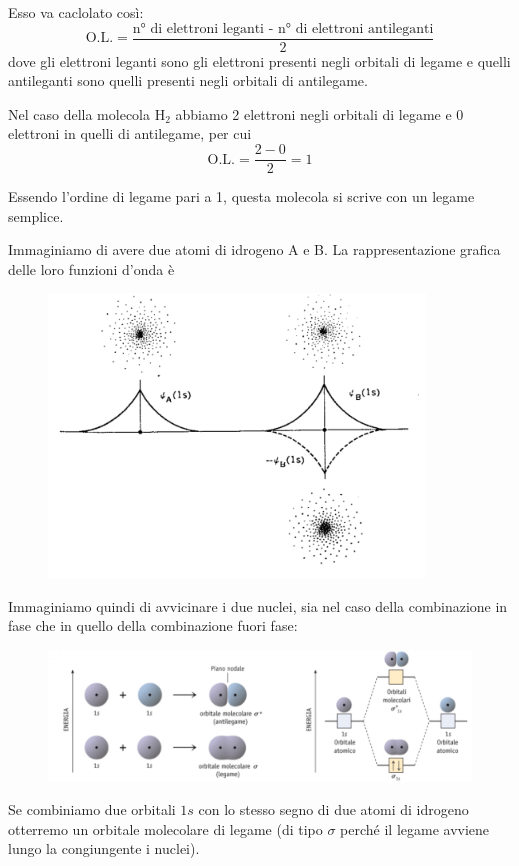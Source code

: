 Esso va caclolato così:
$$\text{O.L.}=\frac{\text{n° di elettroni leganti - n° di elettroni antileganti}}{2}$$
dove gli elettroni leganti sono gli elettroni presenti negli orbitali di legame e quelli antileganti sono quelli presenti negli orbitali di antilegame.

Nel caso della molecola H$_2$ abbiamo 2 elettroni negli orbitali di legame e 0 elettroni in quelli di antilegame, per cui
$$\text{O.L.}=\frac{2-0}{2}=1$$

Essendo l'ordine di legame pari a 1, questa molecola si scrive con un legame semplice.

\vspace{0.2cm}Immaginiamo di avere due atomi di idrogeno A e B. La rappresentazione grafica delle loro funzioni d'onda è

\begin{figure}[htp]
    \centering
    \includegraphics[width=10cm]{immagini/orbitali_atomici.png}
\end{figure}

Immaginiamo quindi di avvicinare i due nuclei, sia nel caso della combinazione in fase che in quello della combinazione fuori fase:

\begin{figure}[htp]
    \centering
    \includegraphics[width=12cm]{immagini/orbitali_molecolari_H_2.png}
\end{figure}

Se combiniamo due orbitali $1s$ con lo stesso segno di due atomi di idrogeno otterremo un orbitale molecolare di legame (di tipo $\sigma$ perché il legame avviene lungo la congiungente i nuclei).

